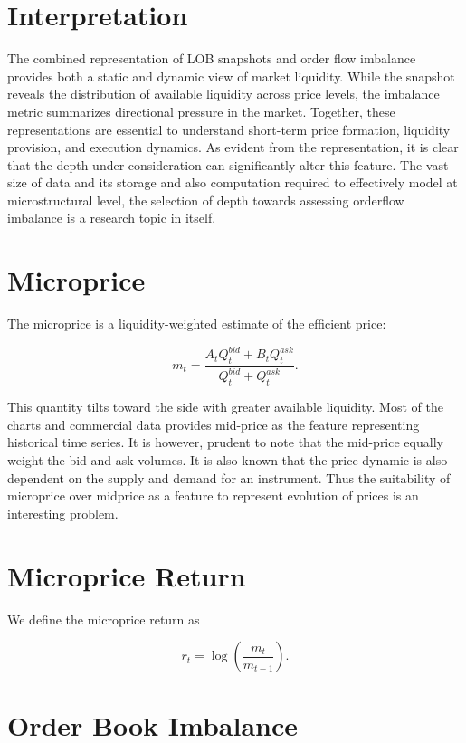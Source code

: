 \documentclass[12pt,a4paper]{report}
\begin{document}
\section{Interpretation}

The combined representation of LOB snapshots and order flow imbalance provides both a static and dynamic view of market liquidity. While the snapshot reveals the distribution of available liquidity across price levels, the imbalance metric summarizes directional pressure in the market. Together, these representations are essential to understand short-term price formation, liquidity provision, and execution dynamics. 
As evident from the representation, it is clear that the depth under consideration can significantly alter this feature. The vast size of data and its storage and also computation required to effectively model at microstructural level, the selection of depth towards assessing orderflow imbalance is a research topic in itself.
 

\section{Microprice}

The microprice is a liquidity-weighted estimate of the efficient price:

\[
m_t =
\frac{A_t Q_t^{bid} + B_t Q_t^{ask}}
     {Q_t^{bid} + Q_t^{ask}}.
\]

This quantity tilts toward the side with greater available liquidity. Most of the charts and commercial data provides mid-price as the feature representing historical time series. It is however, prudent to note that the mid-price equally weight the bid and ask volumes. It is also known that the price dynamic is also dependent on the supply and demand for an instrument. Thus the suitability of microprice over midprice as a feature to represent evolution of prices is an interesting problem.

\section{Microprice Return}

We define the microprice return as

\[
r_t =
\log\left(\frac{m_t}{m_{t-1}}\right).
\]

\section{Order Book Imbalance}
\end{document}
